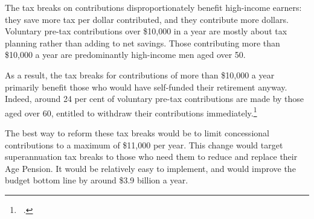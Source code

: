 The tax breaks on contributions disproportionately benefit high-income earners: they save more tax per dollar contributed, and they contribute more dollars. Voluntary pre-tax contributions over \$10,000 in a year are mostly about tax planning rather than adding to net savings. Those contributing more than \$10,000 a year are predominantly high-income men aged over 50. 

As a result, the tax breaks for contributions of more than \$10,000 a year primarily benefit those who would have self-funded their retirement anyway. Indeed, around 24 per cent of voluntary pre-tax contributions are made by those aged over 60, entitled to withdraw their contributions immediately.\footnote{\gao\ \textcite{ATO2015SampleFile1213}.\DEVIATION{}} 

The best way to reform these tax breaks would be to limit concessional contributions to a maximum of \$11,000 per year. This change would target superannuation tax breaks to those who need them to reduce and replace their Age Pension. It would be relatively easy to implement, and would improve the budget bottom line by around \$3.9 billion a year.

